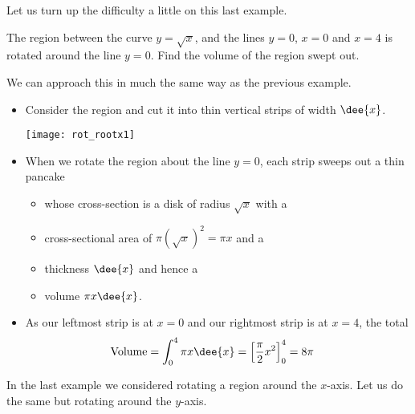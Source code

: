 Let us turn up the difficulty a little on this last example.
\begin{eg}\label{eg rot xaxis}
The region between the curve $y=\sqrt{x}$, and the lines $y=0$, $x=0$ and $x=4$
is rotated around the line $y=0$. Find the volume of the region swept out.

\soln We can approach this in much the same way as the previous example.
\begin{itemize}
 \item Consider the region and cut it into thin vertical strips of width $\dee{x}$.
\begin{efig}
 \centering
\texttt{[image: rot\_rootx1]}
\end{efig}

\item When we rotate the region about the line $y=0$, each strip sweeps out a thin
pancake
\begin{itemize}
\item
whose cross-section is a disk of radius $\sqrt{x}$ with a
\item
cross-sectional area of $\pi (\sqrt{x})^2 = \pi x$ and a
\item
thickness $\dee{x}$ and hence a
\item
volume $\pi x \dee{x}$.
\end{itemize}
\item As our leftmost strip is at $x=0$ and our rightmost strip is
at $x=4$, the total
\begin{align*}
\text{Volume}
&= \int _0^4 \pi x \dee{x}
=\left[\frac{\pi}{2}x^2 \right]_0^4
=8\pi
\end{align*}
\end{itemize}

\end{eg}
In the last example we considered rotating a region around the $x$-axis. Let us do the
same but rotating around the $y$-axis.
